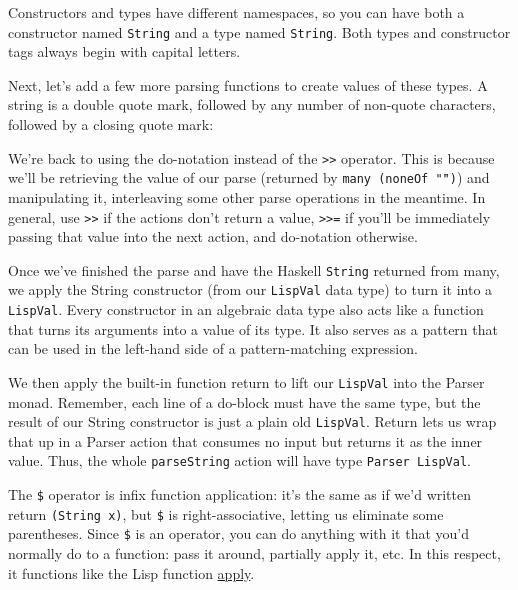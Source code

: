 Constructors and types have different namespaces, so you can have both a constructor named \verb|String| and a type named \verb|String|. Both types and constructor tags always begin with capital letters.
 
Next, let's add a few more parsing functions to create values of these types. A string is a double quote mark, followed by any number of non-quote characters, followed by a closing quote mark:
 
 
We're back to using the do-notation instead of the \lstinline|>>| operator. This is because we'll be retrieving the value of our parse (returned by \lstinline|many (noneOf "|\textcolor{string}{\texttt{\"}}\lstinline|"|\lstinline|)|) and manipulating it, interleaving some other parse operations in the meantime. In general, use \lstinline|>>| if the actions don't return a value, \lstinline|>>=| if you'll be immediately passing that value into the next action, and do-notation otherwise.
 
Once we've finished the parse and have the Haskell \verb|String| returned from many, we apply the String constructor (from our \verb|LispVal| data type) to turn it into a \verb|LispVal|. Every constructor in an algebraic data type also acts like a function that turns its arguments into a value of its type. It also serves as a pattern that can be used in the left-hand side of a pattern-matching expression.
 
We then apply the built-in function return to lift our \verb|LispVal| into the Parser monad. Remember, each line of a do-block must have the same type, but the result of our String constructor is just a plain old \verb|LispVal|. Return lets us wrap that up in a Parser action that consumes no input but returns it as the inner value. Thus, the whole \verb|parseString| action will have type \verb|Parser LispVal|.
 
The \verb|$| operator is infix function application: it's the same as if we'd written return \lstinline|(String x)|, but \verb|$| is right-associative, letting us eliminate some parentheses. Since \verb|$| is an operator, you can do anything with it that you'd normally do to a function: pass it around, partially apply it, etc. In this respect, it functions like the Lisp function \href{http://www.schemers.org/Documents/Standards/R5RS/HTML/r5rs-Z-H-9.html\#\%_sec_6.4}{apply}.
 
